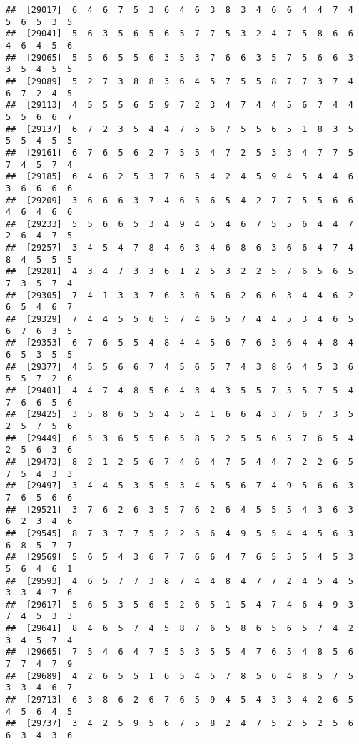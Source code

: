 \documentclass[
]{book}
\begin{document}
\begin{verbatim}
##  [29017]  6  4  6  7  5  3  6  4  6  3  8  3  4  6  6  4  4  7  4  5  6  5  3  5
##  [29041]  5  6  3  5  6  5  6  5  7  7  5  3  2  4  7  5  8  6  6  4  6  4  5  6
##  [29065]  5  5  6  5  5  6  3  5  3  7  6  6  3  5  7  5  6  6  3  3  5  4  5  5
##  [29089]  5  2  7  3  8  8  3  6  4  5  7  5  5  8  7  7  3  7  4  6  7  2  4  5
##  [29113]  4  5  5  5  6  5  9  7  2  3  4  7  4  4  5  6  7  4  4  5  5  6  6  7
##  [29137]  6  7  2  3  5  4  4  7  5  6  7  5  5  6  5  1  8  3  5  5  5  4  5  5
##  [29161]  6  7  6  5  6  2  7  5  5  4  7  2  5  3  3  4  7  7  5  7  4  5  7  4
##  [29185]  6  4  6  2  5  3  7  6  5  4  2  4  5  9  4  5  4  4  6  3  6  6  6  6
##  [29209]  3  6  6  6  3  7  4  6  5  6  5  4  2  7  7  5  5  6  6  4  6  4  6  6
##  [29233]  5  5  6  6  5  3  4  9  4  5  4  6  7  5  5  6  4  4  7  2  6  4  7  5
##  [29257]  3  4  5  4  7  8  4  6  3  4  6  8  6  3  6  6  4  7  4  8  4  5  5  5
##  [29281]  4  3  4  7  3  3  6  1  2  5  3  2  2  5  7  6  5  6  5  7  3  5  7  4
##  [29305]  7  4  1  3  3  7  6  3  6  5  6  2  6  6  3  4  4  6  2  6  5  4  6  7
##  [29329]  7  4  4  5  5  6  5  7  4  6  5  7  4  4  5  3  4  6  5  6  7  6  3  5
##  [29353]  6  7  6  5  5  4  8  4  4  5  6  7  6  3  6  4  4  8  4  6  5  3  5  5
##  [29377]  4  5  5  6  6  7  4  5  6  5  7  4  3  8  6  4  5  3  6  5  5  7  2  6
##  [29401]  4  4  7  4  8  5  6  4  3  4  3  5  5  7  5  5  7  5  4  7  6  6  5  6
##  [29425]  3  5  8  6  5  5  4  5  4  1  6  6  4  3  7  6  7  3  5  2  5  7  5  6
##  [29449]  6  5  3  6  5  5  6  5  8  5  2  5  5  6  5  7  6  5  4  2  5  6  3  6
##  [29473]  8  2  1  2  5  6  7  4  6  4  7  5  4  4  7  2  2  6  5  7  5  4  3  3
##  [29497]  3  4  4  5  3  5  5  3  4  5  5  6  7  4  9  5  6  6  3  7  6  5  6  6
##  [29521]  3  7  6  2  6  3  5  7  6  2  6  4  5  5  5  4  3  6  3  6  2  3  4  6
##  [29545]  8  7  3  7  7  5  2  2  5  6  4  9  5  5  4  4  5  6  3  6  8  5  7  7
##  [29569]  5  6  5  4  3  6  7  7  6  6  4  7  6  5  5  5  4  5  3  5  6  4  6  1
##  [29593]  4  6  5  7  7  3  8  7  4  4  8  4  7  7  2  4  5  4  5  3  3  4  7  6
##  [29617]  5  6  5  3  5  6  5  2  6  5  1  5  4  7  4  6  4  9  3  7  4  5  3  3
##  [29641]  8  4  6  5  7  4  5  8  7  6  5  8  6  5  6  5  7  4  2  3  4  5  7  4
##  [29665]  7  5  4  6  4  7  5  5  3  5  5  4  7  6  5  4  8  5  6  7  7  4  7  9
##  [29689]  4  2  6  5  5  1  6  5  4  5  7  8  5  6  4  8  5  7  5  3  3  4  6  7
##  [29713]  6  3  8  6  2  6  7  6  5  9  4  5  4  3  3  4  2  6  5  4  5  6  4  5
##  [29737]  3  4  2  5  9  5  6  7  5  8  2  4  7  5  2  5  2  5  6  6  3  4  3  6

\end{verbatim}
\end{document}
